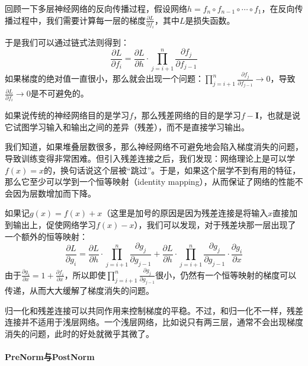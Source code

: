 回顾一下多层神经网络的反向传播过程，假设网络$h = f_n \circ f_{n-1} \circ \cdots \circ f_1$，在反向传播过程中，我们需要计算每一层的梯度$\frac{\partial L}{\partial f_i}$，其中$L$是损失函数。

于是我们可以通过链式法则得到：
\begin{equation}
    \frac{\partial L}{\partial f_i} = \frac{\partial L}{\partial h} \cdot \prod_{j=i+1}^{n} \frac{\partial f_j}{\partial f_{j-1}}
\end{equation}
如果梯度的绝对值一直很小，那么就会出现一个问题：$\prod_{j=i+1}^{n} \frac{\partial f_j}{\partial f_{j-1}} \rightarrow 0$，导致$\frac{\partial L}{\partial f_i} \rightarrow 0$是不可避免的。

如果说传统的神经网络目的是学习$f$，那么残差网络的目的是学习$f - \mathbf{I}$，也就是说它试图学习输入和输出之间的差异（残差），而不是直接学习输出。

我们知道，如果堆叠层数很多，那么神经网络不可避免地会陷入梯度消失的问题，导致训练变得非常困难。但引入残差连接之后，我们发现：网络理论上是可以学$f(x)=x$的，换句话说这个层被“跳过”\cite{he2015deepresiduallearningimage}。于是，如果这个层学不到有用的特征，那么它至少可以学到一个恒等映射（identity mapping），从而保证了网络的性能不会因为层数增加而下降。

如果记$g(x) = f(x) + x$（这里是加号的原因是因为残差连接是将输入$x$直接加到输出上，促使网络学习$f(x) - x$），我们可以发现，对于残差块那一层出现了一个额外的恒等映射：
\begin{equation}
    \frac{\partial L}{\partial g_i} = \frac{\partial L}{\partial h} \cdot \prod_{j=i+1}^{n} \frac{\partial g_j}{\partial g_{j-1}} + \frac{\partial L}{\partial h} \cdot \prod_{j=i+1}^{n} \frac{\partial g_j}{\partial g_{j-1}} \cdot \frac{\partial g_i}{\partial x}
\end{equation}
由于$\frac{\partial g_i}{\partial x} = 1 + \frac{\partial f_i}{\partial x}$，所以即使$\prod_{j=i+1}^{n} \frac{\partial g_j}{\partial g_{j-1}}$很小，仍然有一个恒等映射的梯度可以传递\cite{he2015deepresiduallearningimage,he2016identitymappingsdeepresidual}，从而大大缓解了梯度消失的问题。

归一化和残差连接可以共同作用来控制梯度的平稳\cite{panigrahi2018analysisgradientpropagationbatch}。不过，和归一化不一样，残差连接并不适用于浅层网络。一个浅层网络，比如说只有两三层，通常不会出现梯度消失的问题，此时的好处就微乎其微了。

\paragraph{PreNorm与PostNorm}

